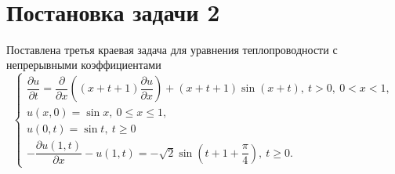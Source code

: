 \documentclass[a4paper, 12pt]{article}
\renewcommand{\d}{\partial}
\begin{document}
    \begin{center}
    \end{center}
    { \hspace*{\fill} \\}
    
\section*{Постановка задачи 2}
Поставлена третья краевая задача для уравнения теплопроводности с непрерывными коэффициентами
\begin{equation}
	\begin{cases}
		\dfrac{\d u}{\d t} = \dfrac{\d }{\d x}\left((x+t+1)\dfrac{\d u}{\d x}\right) +(x+t+1)\sin(x+t),\ t>0,\ 0 < x < 1,\\
		u(x,0) = \sin x,\ 0 \leq x \leq 1,\\
		u(0,t)=\sin t,\ t\geq 0\\ 
		-\dfrac{\d u(1,t)}{\d x} - u(1,t) = - \sqrt2\sin\left(t+1+\dfrac \pi 4\right),\ t\geq 0.
	\end{cases}
\end{equation}
\end{document}
